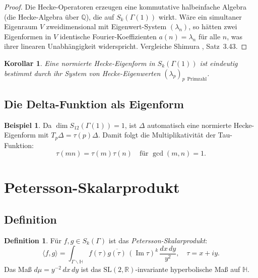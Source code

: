 \documentclass[12pt,a4paper]{amsart}
\newtheorem{korollar}[theorem]{Korollar}
\theoremstyle{definition}
\newtheorem{definition}[theorem]{Definition}
\newtheorem{beispiel}[theorem]{Beispiel}
\begin{document}
\begin{proof}
  Die Hecke-Operatoren erzeugen eine kommutative halbeinfache Algebra (die
  Hecke-Algebra \"uber $\mathbb{Q}$), die auf $S_k(\Gamma(1))$ wirkt. W\"are
  ein simultaner Eigenraum $V$ zweidimensional mit Eigenwert-System $(\lambda_n)$,
  so h\"atten zwei Eigenformen in $V$ identische Fourier-Koeffizienten
  $a(n) = \lambda_n$ f\"ur alle $n$, was ihrer linearen Unabh\"angigkeit widerspricht.
  Vergleiche Shimura \cite{Shimura}, Satz~3.43.
\end{proof}

\begin{korollar}\label{kor:mult-eins}
  Eine normierte Hecke-Eigenform in $S_k(\Gamma(1))$ ist eindeutig bestimmt
  durch ihr System von Hecke-Eigenwerten $(\lambda_p)_{p\,\text{ Primzahl}}$.
\end{korollar}

\subsection{Die Delta-Funktion als Eigenform}

\begin{beispiel}
  Da $\dim S_{12}(\Gamma(1)) = 1$, ist $\Delta$ automatisch eine normierte
  Hecke-Eigenform mit $T_p\Delta = \tau(p)\Delta$. Damit folgt die
  Multiplikativit\"at der Tau-Funktion:
  \[
    \tau(mn) = \tau(m)\tau(n) \quad \text{f\"ur } \gcd(m,n)=1.
  \]
\end{beispiel}

\section{Petersson-Skalarprodukt}\label{sec:petersson}

\subsection{Definition}

\begin{definition}
  F\"ur $f, g \in S_k(\Gamma)$ ist das \emph{Petersson-Skalarprodukt}:
  \[
    \langle f, g \rangle = \int_{\Gamma \backslash \mathbb{H}}
    f(\tau)\overline{g(\tau)}\,(\operatorname{Im}\tau)^k\,
    \frac{dx\,dy}{y^2}, \quad \tau = x+iy.
\]
  Das Ma{\ss} $d\mu = y^{-2}\,dx\,dy$ ist das $\mathrm{SL}(2,\mathbb{R})$-invariante
  hyperbolische Ma{\ss} auf $\mathbb{H}$.
\end{definition}
\end{document}
